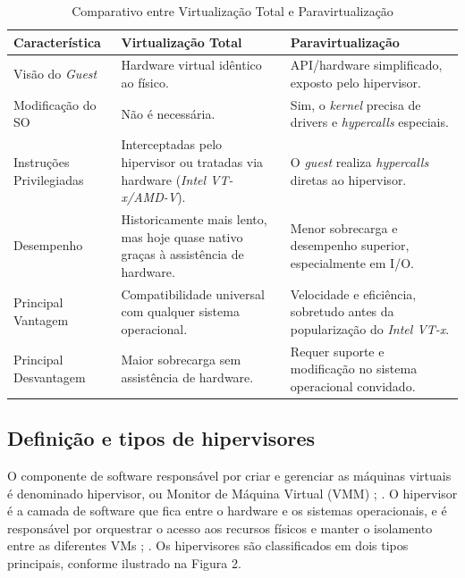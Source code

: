 \begin{table}[htb]
    \centering

    \caption{Comparativo entre Virtualização Total e Paravirtualização}
    \label{tab:comparativo_virtualizacao}

    \begin{tabularx}{\textwidth}{ l >{\RaggedRight}X >{\RaggedRight}X }
        \toprule
        \textbf{Característica} & \textbf{Virtualização Total} & \textbf{Paravirtualização} \\
        \midrule
        Visão do \textit{Guest} & Hardware virtual idêntico ao físico. & API/hardware simplificado, exposto pelo hipervisor. \\
        \addlinespace
        Modificação do SO & Não é necessária. & Sim, o \textit{kernel} precisa de drivers e \textit{hypercalls} especiais. \\
        \addlinespace
        Instruções Privilegiadas & Interceptadas pelo hipervisor ou tratadas via hardware (\textit{Intel VT-x/AMD-V}). & O \textit{guest} realiza \textit{hypercalls} diretas ao hipervisor. \\
        \addlinespace
        Desempenho & Historicamente mais lento, mas hoje quase nativo graças à assistência de hardware. & Menor sobrecarga e desempenho superior, especialmente em I/O. \\
        \addlinespace
        Principal Vantagem & Compatibilidade universal com qualquer sistema operacional. & Velocidade e eficiência, sobretudo antes da popularização do \textit{Intel VT-x}. \\
        \addlinespace
        Principal Desvantagem & Maior sobrecarga sem assistência de hardware. & Requer suporte e modificação no sistema operacional convidado. \\
        \bottomrule
    \end{tabularx}

\end{table}

\subsection{Definição e tipos de hipervisores}
O componente de software responsável por criar e gerenciar as máquinas virtuais é denominado hipervisor, ou Monitor de Máquina Virtual (VMM) \cite{chawla2025}; \cite{carissimi2008}. O hipervisor é a camada de software que fica entre o hardware e os sistemas operacionais, e é responsável por orquestrar o acesso aos recursos físicos e manter o isolamento entre as diferentes VMs \cite{chawla2025}; \cite{carissimi2008}. Os hipervisores são classificados em dois tipos principais, conforme ilustrado na Figura 2.

